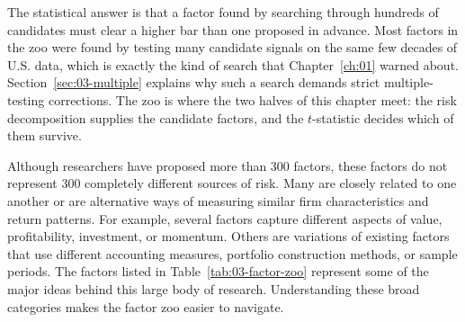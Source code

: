 The statistical answer is that a factor found by searching through hundreds of candidates must clear a higher bar than one proposed in advance. Most factors in the zoo were found by testing many candidate signals on the same few decades of U.S. data, which is exactly the kind of search that Chapter~\ref{ch:01} warned about. Section~\ref{sec:03-multiple} explains why such a search demands strict multiple-testing corrections. The zoo is where the two halves of this chapter meet: the risk decomposition supplies the candidate factors, and the $t$-statistic decides which of them survive.

Although researchers have proposed more than 300 factors, these
factors do not represent 300 completely different sources of risk.
Many are closely related to one another or are alternative ways of
measuring similar firm characteristics and return patterns. For
example, several factors capture different aspects of value,
profitability, investment, or momentum. Others are variations of
existing factors that use different accounting measures, portfolio
construction methods, or sample periods. The factors listed in
Table~\ref{tab:03-factor-zoo} represent some of the major ideas
behind this large body of research. Understanding these broad
categories makes the factor zoo easier to navigate.

